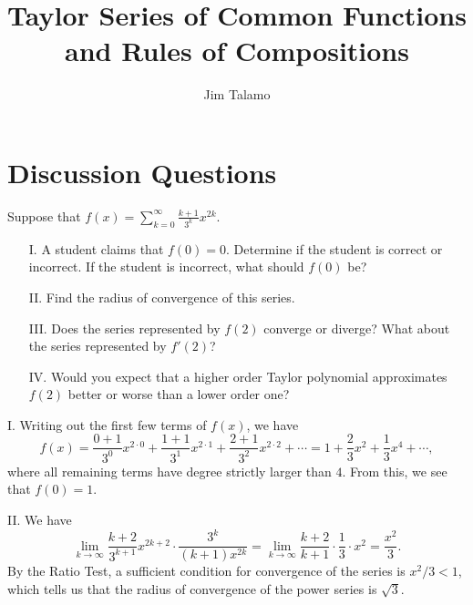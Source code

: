 \documentclass[noauthor]{ximera}
\author{Jim Talamo}
\title{Taylor Series of Common Functions and Rules of Compositions}
\begin{document}
\begin{abstract}
\end{abstract}
\maketitle

\vspace{-0.9in}

\section{Discussion Questions}

\begin{problem} 

Suppose that $\displaystyle f(x) = \sum_{k=0}^{\infty} \frac{k+1}{3^k}x^{2k}.$

\begin{itemize}
\item[I.] A student claims that $f(0)=0$.  Determine if the student is correct or incorrect.  If the student is incorrect, what should $f(0)$ be?
\item[II.] Find the radius of convergence of this series.
\item[III.] Does the series represented by $f(2)$ converge or diverge?  What about the series represented by $f'(2)$? 
\item[IV.] Would you expect that a higher order Taylor polynomial approximates $f(2)$ better or worse than a lower order one? 
\end{itemize}

\begin{freeResponse}
I. Writing out the first few terms of $f(x)$, we have
$$
f(x)= \frac{0+1}{3^0}x^{2\cdot 0} + \frac{1+1}{3^1} x^{2\cdot 1}+ \frac{2+1}{3^2} x^{2 \cdot 2} + \cdots = 1 + \frac{2}{3}x^2 + \frac{1}{3}x^4 + \cdots,
$$
where all remaining terms have degree strictly larger than $4$. From this, we see that $f(0)=1$.

II. We have
$$
\lim_{k \rightarrow \infty} \frac{k+2}{3^{k+1}} x^{2k+2} \cdot \frac{3^k}{(k+1) x^{2k}}= \lim_{k \rightarrow \infty} \frac{k+2}{k+1} \cdot \frac{1}{3} \cdot x^2 = \frac{x^2}{3}.
$$
By the Ratio Test, a sufficient condition for convergence of the series is $x^2/3 < 1$, which tells us that the radius of convergence of the power series is $\sqrt{3}$.


\end{freeResponse}
\end{problem}
\end{document}
